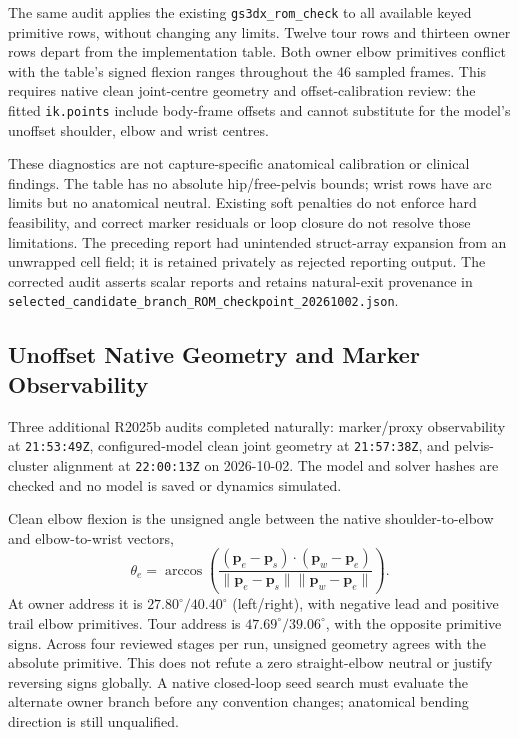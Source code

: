 \documentclass[11pt,a4paper]{article}
\begin{document}
The same audit applies the existing \texttt{gs3dx\_rom\_check} to
all available keyed primitive rows, without changing any limits.
Twelve tour rows and thirteen owner rows depart from the implementation
table. Both owner elbow primitives conflict with the table's signed
flexion ranges throughout the 46 sampled frames. This requires native
clean joint-centre geometry and offset-calibration review: the fitted
\texttt{ik.points} include body-frame offsets and cannot substitute
for the model's unoffset shoulder, elbow and wrist centres.

These diagnostics are not capture-specific anatomical calibration or
clinical findings. The table has no absolute hip/free-pelvis bounds;
wrist rows have arc limits but no anatomical neutral. Existing
soft penalties do not enforce hard feasibility, and correct marker
residuals or loop closure do not resolve those limitations. The
preceding report had unintended struct-array expansion from an
unwrapped cell field; it is retained privately as rejected reporting
output. The corrected audit asserts scalar reports and retains
natural-exit provenance in
\texttt{selected\_candidate\_branch\_ROM\_checkpoint\_20261002.json}.
\subsection{Unoffset Native Geometry and Marker Observability}
Three additional R2025b audits completed naturally: marker/proxy
observability at \texttt{21:53:49Z}, configured-model clean joint
geometry at \texttt{21:57:38Z}, and pelvis-cluster alignment at
\texttt{22:00:13Z} on 2026-10-02. The model and solver hashes are
checked and no model is saved or dynamics simulated.

Clean elbow flexion is the unsigned angle between the native
shoulder-to-elbow and elbow-to-wrist vectors,
\[
 \theta_e=\arccos\!\left(
 \frac{(\mathbf p_e-\mathbf p_s)\cdot(\mathbf p_w-\mathbf p_e)}
 {\lVert\mathbf p_e-\mathbf p_s\rVert
  \lVert\mathbf p_w-\mathbf p_e\rVert}\right).
\]
At owner address it is $27.80^\circ/40.40^\circ$ (left/right),
with negative lead and positive trail elbow primitives. Tour address
is $47.69^\circ/39.06^\circ$, with the opposite primitive signs.
Across four reviewed stages per run, unsigned geometry agrees with
the absolute primitive. This does not refute a zero straight-elbow
neutral or justify reversing signs globally. A native closed-loop
seed search must evaluate the alternate owner branch before any
convention changes; anatomical bending direction is still unqualified.
\end{document}
